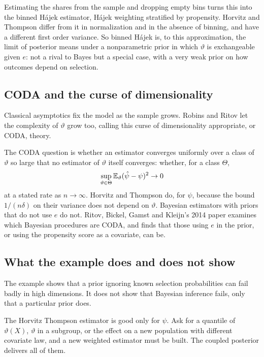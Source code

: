 Estimating the shares from the sample and dropping empty bins turns this into the binned H\'ajek estimator, H\'ajek weighting stratified by propensity. Horvitz and Thompson differ from it in normalization and in the absence of binning, and have a different first order variance. So binned H\'ajek is, to this approximation, the limit of posterior means under a nonparametric prior in which $\vartheta$ is exchangeable given $e$: not a rival to Bayes but a special case, with a very weak prior on how outcomes depend on selection.

\subsection{CODA and the curse of dimensionality}

Classical asymptotics fix the model as the sample grows. Robins and Ritov let the complexity of $\vartheta$ grow too, calling this curse of dimensionality appropriate, or CODA, theory.

The CODA question is whether an estimator converges uniformly over a class of $\vartheta$ so large that no estimator of $\vartheta$ itself converges: whether, for a class $\Theta$,
\[
\sup_{\vartheta \in \Theta} \mathbb{E}_\vartheta(\hat\psi - \psi)^2 \to 0
\]
at a stated rate as $n \to \infty$. Horvitz and Thompson do, for $\psi$, because the bound $1/(n\delta)$ on their variance does not depend on $\vartheta$. Bayesian estimators with priors that do not use $e$ do not. Ritov, Bickel, Gamst and Kleijn's 2014 paper examines which Bayesian procedures are CODA, and finds that those using $e$ in the prior, or using the propensity score as a covariate, can be.



\subsection{What the example does and does not show}

The example shows that a prior ignoring known selection probabilities can fail badly in high dimensions. It does not show that Bayesian inference fails, only that a particular prior does.

The Horvitz Thompson estimator is good only for $\psi$. Ask for a quantile of $\vartheta(X)$, $\vartheta$ in a subgroup, or the effect on a new population with different covariate law, and a new weighted estimator must be built. The coupled posterior delivers all of them.

